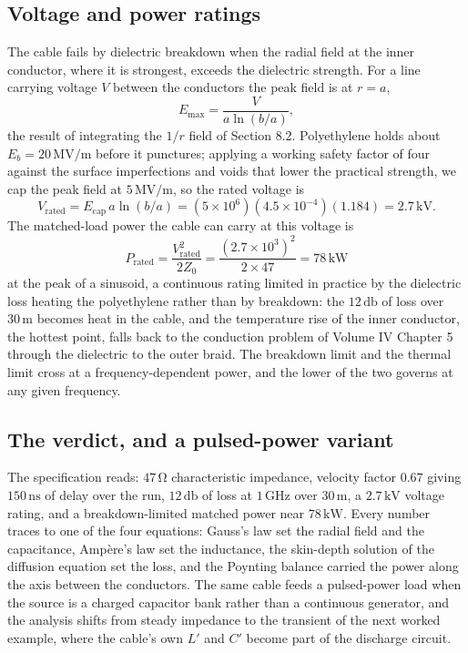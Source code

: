 \subsection{Voltage and power ratings}

The cable fails by dielectric breakdown when the radial field at the
inner conductor, where it is strongest, exceeds the dielectric strength.
For a line carrying voltage $V$ between the conductors the peak field is
at $r = a$,
\[
E_{\max} = \frac{V}{a\ln(b/a)},
\]
the result of integrating the $1/r$ field of Section 8.2. Polyethylene
holds about $E_b = 20\,\si{\mega\volt\per\meter}$ before it punctures;
applying a working safety factor of four against the surface
imperfections and voids that lower the practical strength, we cap the
peak field at $5\,\si{\mega\volt\per\meter}$, so the rated voltage is
\[
V_{\text{rated}} = E_{\text{cap}}\,a\ln(b/a) = (5\times 10^{6})(4.5
\times 10^{-4})(1.184) = 2.7\,\si{\kilo\volt}.
\]
The matched-load power the cable can carry at this voltage is
\[
P_{\text{rated}} = \frac{V_{\text{rated}}^{2}}{2 Z_0} = \frac{(2.7
\times 10^{3})^{2}}{2\times 47} = 78\,\si{\kilo\watt}
\]
at the peak of a sinusoid, a continuous rating limited in practice by
the dielectric loss heating the polyethylene rather than by breakdown:
the $12\,\si{\decibel}$ of loss over $30\,\si{\meter}$ becomes heat in
the cable, and the temperature rise of the inner conductor, the hottest
point, falls back to the conduction problem of Volume IV Chapter 5
through the dielectric to the outer braid. The breakdown limit and the
thermal limit cross at a frequency-dependent power, and the lower of the
two governs at any given frequency.

\subsection{The verdict, and a pulsed-power variant}

The specification reads: $47\,\si{\ohm}$ characteristic impedance,
velocity factor $0.67$ giving $150\,\si{\nano\second}$ of delay over the
run, $12\,\si{\decibel}$ of loss at $1\,\si{\giga\hertz}$ over
$30\,\si{\meter}$, a $2.7\,\si{\kilo\volt}$ voltage rating, and a
breakdown-limited matched power near $78\,\si{\kilo\watt}$. Every number
traces to one of the four equations: Gauss's law set the radial field
and the capacitance, Amp\`ere's law set the inductance, the skin-depth
solution of the diffusion equation set the loss, and the Poynting
balance carried the power along the axis between the conductors. The
same cable feeds a pulsed-power load when the source is a charged
capacitor bank rather than a continuous generator, and the analysis
shifts from steady impedance to the transient of the next worked
example, where the cable's own $L'$ and $C'$ become part of the
discharge circuit.

